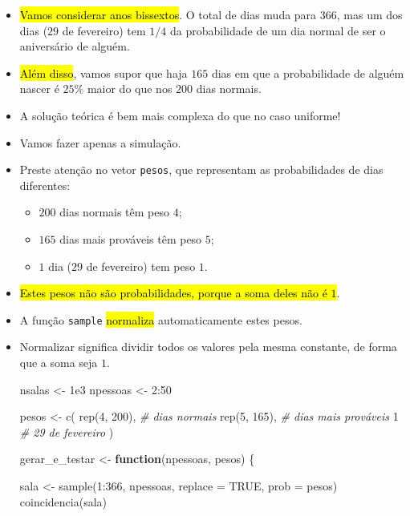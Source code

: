 \documentclass[
  11pt]{report}
\newenvironment{Shaded}{\begin{snugshade}}{\end{snugshade}}
\newcommand{\AttributeTok}[1]{\textcolor[rgb]{0.77,0.63,0.00}{#1}}
\newcommand{\CommentTok}[1]{\textcolor[rgb]{0.56,0.35,0.01}{\textit{#1}}}
\newcommand{\ConstantTok}[1]{\textcolor[rgb]{0.00,0.00,0.00}{#1}}
\newcommand{\ControlFlowTok}[1]{\textcolor[rgb]{0.13,0.29,0.53}{\textbf{#1}}}
\newcommand{\DecValTok}[1]{\textcolor[rgb]{0.00,0.00,0.81}{#1}}
\newcommand{\FloatTok}[1]{\textcolor[rgb]{0.00,0.00,0.81}{#1}}
\newcommand{\FunctionTok}[1]{\textcolor[rgb]{0.00,0.00,0.00}{#1}}
\newcommand{\NormalTok}[1]{#1}
\newcommand{\OtherTok}[1]{\textcolor[rgb]{0.56,0.35,0.01}{#1}}
\newcommand{\SpecialCharTok}[1]{\textcolor[rgb]{0.00,0.00,0.00}{#1}}
\renewenvironment{Shaded}{
    \begin{mdframed}[%
      roundcorner=2pt,%
      innerleftmargin=5pt,%
      innerrightmargin=5pt,%
      topline=true,%
      leftline=true,%
      rightline=true,%
      bottomline=true,%
      linewidth=0.5pt,%
      linecolor=black!20,%
      backgroundcolor=black!2,%
      skipabove=2ex,%
      skipbelow=2.5ex%
    ]%
  }
  {
    \end{mdframed}
  }
\begin{document}
\begin{itemize}
\item
  {\hl{Vamos considerar anos bissextos}}. O total de dias muda para $366$, mas um dos dias ($29$ de fevereiro) tem $1/4$ da probabilidade de um dia normal de ser o aniversário de alguém.
\item
  {\hl{Além disso}}, vamos supor que haja $165$ dias em que a probabilidade de alguém nascer é $25\%$ maior do que nos $200$ dias normais.
\item
  A solução teórica é bem mais complexa do que no caso uniforme!
\item
  Vamos fazer apenas a simulação.
\item
  Preste atenção no vetor \texttt{pesos}, que representam as probabilidades de dias diferentes:

  \begin{itemize}
  \item
    $200$ dias normais têm peso $4$;
  \item
    $165$ dias mais prováveis têm peso $5$;
  \item
    $1$ dia ($29$ de fevereiro) tem peso $1$.
  \end{itemize}
\item
  {\hl{Estes pesos não são probabilidades, porque a soma deles não é $1$}}.
\item
  A função \texttt{sample} {\hl{normaliza}} automaticamente estes pesos.
\item
  Normalizar significa dividir todos os valores pela mesma constante, de forma que a soma seja $1$.

\begin{Shaded}
\begin{Highlighting}[]
\NormalTok{nsalas }\OtherTok{\textless{}{-}} \FloatTok{1e3}
\NormalTok{npessoas }\OtherTok{\textless{}{-}} \DecValTok{2}\SpecialCharTok{:}\DecValTok{50}

\NormalTok{pesos }\OtherTok{\textless{}{-}} \FunctionTok{c}\NormalTok{(}
  \FunctionTok{rep}\NormalTok{(}\DecValTok{4}\NormalTok{, }\DecValTok{200}\NormalTok{),    }\CommentTok{\# dias normais}
  \FunctionTok{rep}\NormalTok{(}\DecValTok{5}\NormalTok{, }\DecValTok{165}\NormalTok{),    }\CommentTok{\# dias mais prováveis}
  \DecValTok{1}               \CommentTok{\# 29 de fevereiro}
\NormalTok{)}

\NormalTok{gerar\_e\_testar }\OtherTok{\textless{}{-}} \ControlFlowTok{function}\NormalTok{(npessoas, pesos) \{}

\NormalTok{  sala }\OtherTok{\textless{}{-}} \FunctionTok{sample}\NormalTok{(}\DecValTok{1}\SpecialCharTok{:}\DecValTok{366}\NormalTok{, npessoas, }\AttributeTok{replace =} \ConstantTok{TRUE}\NormalTok{, }\AttributeTok{prob =}\NormalTok{ pesos)}
  \FunctionTok{coincidencia}\NormalTok{(sala)}


\end{Highlighting}
\end{Shaded}
\end{itemize}
\end{document}
